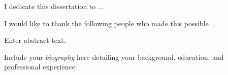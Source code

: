 \documentclass[11 pt]{report}
\begin{document}

\dedicationpage

\noindent I dedicate this dissertation to ...


\acknowledgementspage

\noindent I would like to thank the following people who made this possible ...


\tableofcontents

\listoftables

\listoffigures

\abstractpage

Enter abstract text.

\startofchapters




\appendix
\appendixeqnumbering






\biography

\noindent Include your \emph{biography} here detailing your background, education, and professional experience.
\end{document}
